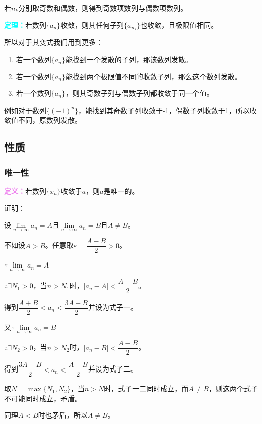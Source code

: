 \documentclass[UTF8, 12pt]{ctexart}
\begin{document}
    若$n_k$分别取奇数和偶数，则得到奇数项数列与偶数项数列。

    \textcolor{aqua}{\textbf{定理：}}若数列$\{a_n\}$收敛，则其任何子列$\{a_{n_k}\}$也收敛，且极限值相同。

    所以对于其变式我们用到更多：

    \begin{enumerate}
        \item 若一个数列$\{a_n\}$能找到一个发散的子列，那该数列发散。
        \item 若一个数列$\{a_n\}$能找到两个极限值不同的收敛子列，那么这个数列发散。
        \item 若一个数列$\{a_n\}$，则其奇数子列与偶数子列都收敛于同一个值。
    \end{enumerate}

    例如对于数列$\{(-1)^n\}$，能找到其奇数子列收敛于-1，偶数子列收敛于1，所以收敛值不同，原数列发散。

    \subsection{性质}

    \subsubsection{唯一性}

    \textcolor{violet}{\textbf{定义：}}若数列$\{x_n\}$收敛于$a$，则$a$是唯一的。

    证明：

    设$\lim\limits_{n\to\infty}a_n=A$且$\lim\limits_{n\to\infty}a_n=B$且$A\neq B$。

    不如设$A>B$。任意取$\varepsilon=\dfrac{A-B}{2}>0$。

    $\because\lim\limits_{n\to\infty}a_n=A$

    $\therefore\exists N_1>0$，当$n>N_1$时，$\vert a_n-A\vert<\dfrac{A-B}{2}$。

    得到$\dfrac{A+B}{2}<a_n<\dfrac{3A-B}{2}$并设为式子一。

    又$\because\lim\limits_{n\to\infty}a_n=B$

    $\therefore\exists N_2>0$，当$n>N_2$时，$\vert a_n-B\vert<\dfrac{A-B}{2}$。

    得到$\dfrac{3A-B}{2}<a_n<\dfrac{A+B}{2}$并设为式子二。

    取$N=\max\{N_1,N_2\}$，当$n>N$时，式子一二同时成立，而$A\neq B$，则这两个式子不可能同时成立，矛盾。

    同理$A<B$时也矛盾，所以$A\neq B$。
\end{document}
